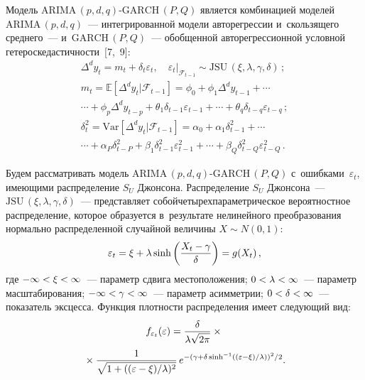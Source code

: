 \begin{multicols}{2}
  Модель $\mathrm{ARIMA}\,(p,d,q)$-$\mathrm{GARCH}\,(P,Q)$ является комбинацией моделей 
$\mathrm{ARIMA}\,(p,d,q)$~--- интегрированной модели авторегрессии и~скользящего 
среднего~--- и~$\mathrm{GARCH}\,(P,Q)$~--- обобщенной авторегрессионной условной 
ге\-те\-ро\-ске\-да\-стич\-ности~[7,~9]: 
  \begin{gather*}
  \Delta^dy_t=m_t+\delta_t\varepsilon_t,\quad \varepsilon_t
  \vert_{\mathcal{F}_{t-1}}\sim \mathrm{JSU}\,(\xi, 
\lambda, \gamma, \delta)\,;\\
  m_t=\mathbb{E}\left[ \Delta^d y_t\vert \mathcal{F}_{t-1} \right] =\phi_0 
+\phi_1\Delta^d y_{t-1}+\cdots \\
\cdots + \phi_p\Delta^d y_{t-p}+\theta_1 \delta_{t-1} 
\varepsilon_{t-1}+\cdots + \theta_q \delta_{t-q} \varepsilon_{t-q}\,;\\[6pt]
  \delta^2_t=\mathrm{Var}\left[ \Delta^d y_t\vert \mathcal{F}_{t-1}\right] =\alpha_0 
+\alpha_1\delta^2_{t-1} +\cdots\\[6pt]
\cdots + \alpha_{P}\delta^2_{t-P}+\beta_1 \delta^2_{t-1} 
\varepsilon^2_{t-1} + \cdots +\beta_Q \delta^2_{t-Q} \varepsilon^2_{t-Q}\,.
   \end{gather*}
  
  Будем рассматривать модель $\mathrm{ARIMA}\,(p,d,q)$-$\mathrm{GARCH}\,(P,Q)$ 
с~ошибками~$\varepsilon_t$, имеющими распределение $S_U$ Джонсона. 
Распределение $S_U$ Джонсона~--- $\mathrm{JSU}\,(\xi, \lambda, \gamma,\delta)$~--- 
представляет собой\linebreak четырехпараметрическое вероятностное распределение, 
которое образуется в~результате нелинейного преобразования нормально 
распределенной случайной величины $X\sim N(0,1)$:
  \begin{equation*}
  \varepsilon_t=\xi +\lambda\,\mathrm{sinh}\left( \displaystyle\frac{\displaystyle X_t-\gamma\mathstrut}{\displaystyle \delta\mathstrut}\right) 
=g(X_t)\,,
  \end{equation*}
где $-\infty <\xi\hm< \infty$~--- параметр сдвига местоположения; $0\hm< 
\lambda\hm< \infty$~--- параметр масштабирования; $-\infty \hm< \gamma \hm< 
\infty$~--- параметр асим\-мет\-рии; $0\hm< \delta\hm<\infty$~--- показатель 
эксцесса. Функция плотности распределения имеет следующий вид:
\begin{multline}
f_{\varepsilon_t}(\varepsilon)=\displaystyle\frac{\displaystyle \delta\mathstrut}{\displaystyle \lambda\sqrt{2\pi}\mathstrut} \times{}\\
{}\times\displaystyle\frac{\displaystyle 1\mathstrut}{\displaystyle \sqrt{1+((\varepsilon-\xi)/\lambda)^2}\mathstrut}\,
e^{-(\gamma+\delta\,\mathrm{sinh}^{-1}(({\varepsilon-\xi})/{\lambda}))^2/2}.
\label{e9-dan}
\end{multline}
  

\end{multicols}
